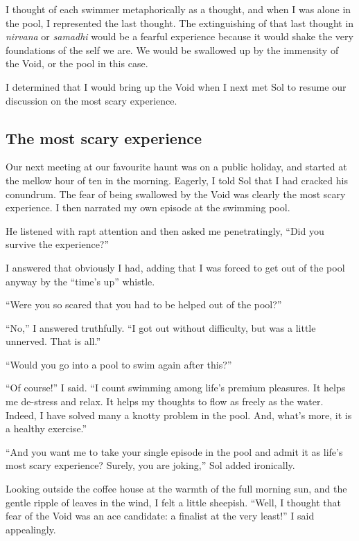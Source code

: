 \documentclass[
  a4paper,
]{article}
\begin{document}
I thought of each swimmer metaphorically as a thought, and when I was
alone in the pool, I represented the last thought. The extinguishing of
that last thought in \emph{nirvana} or \emph{samadhi} would be a fearful
experience because it would shake the very foundations of the self we
are. We would be swallowed up by the immensity of the Void, or the pool
in this case.

I determined that I would bring up the Void when I next met Sol to
resume our discussion on the most scary experience.

\hypertarget{the-most-scary-experience}{%
\subsection{The most scary experience}\label{the-most-scary-experience}}

Our next meeting at our favourite haunt was on a public holiday, and
started at the mellow hour of ten in the morning. Eagerly, I told Sol
that I had cracked his conundrum. The fear of being swallowed by the
Void was clearly the most scary experience. I then narrated my own
episode at the swimming pool.

He listened with rapt attention and then asked me penetratingly, ``Did
you survive the experience?''

I answered that obviously I had, adding that I was forced to get out of
the pool anyway by the ``time's up'' whistle.

``Were you so scared that you had to be helped out of the pool?''

``No,'' I answered truthfully. ``I got out without difficulty, but was a
little unnerved. That is all.''

``Would you go into a pool to swim again after this?''

``Of course!'' I said. ``I count swimming among life's premium
pleasures. It helps me de-stress and relax. It helps my thoughts to flow
as freely as the water. Indeed, I have solved many a knotty problem in
the pool. And, what's more, it is a healthy exercise.''

``And you want me to take your single episode in the pool and admit it
as life's most scary experience? Surely, you are joking,'' Sol added
ironically.

Looking outside the coffee house at the warmth of the full morning sun,
and the gentle ripple of leaves in the wind, I felt a little sheepish.
``Well, I thought that fear of the Void was an ace candidate: a finalist
at the very least!'' I said appealingly.
\end{document}
